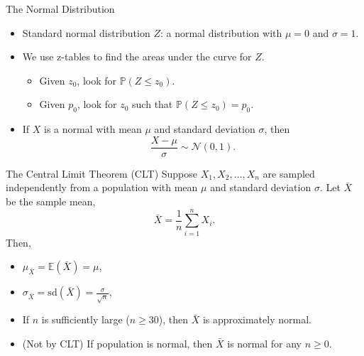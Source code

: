 \documentclass{beamer}
\newcommand{\pr}{\mathbb{P}}
\newcommand{\E}{\mathbb{E}}
\newcommand{\sd}{\text{sd}}
\begin{document}
\begin{frame}{ The Normal Distribution}
\begin{itemize}
    \item Standard normal distribution $Z$: a normal distribution with $\mu=0$ and $\sigma=1$.
    \item We use z-tables to find the areas under the curve for $Z$.
        \begin{itemize}
            \item Given $z_0$, look for $\pr(Z\leq z_0)$.
            \item Given $p_0$, look for $z_0$ such that $\pr(Z \leq z_0) = p_0$.
        \end{itemize}
    \item If $X$ is a normal with mean $\mu$ and standard deviation $\sigma$, then
        $$\frac{X-\mu}{\sigma} \sim \mathcal{N}(0,1).$$ 
\end{itemize}
\end{frame}

\begin{frame}{The Central Limit Theorem (CLT)}
    Suppose $X_1,X_2,\dots,X_n$ are sampled independently from a population with mean $\mu$ and 
    standard deviation $\sigma$. Let $\bar X$ be the sample mean, 
    $$\bar X = \frac{1}{n} \sum_{i=1}^n X_i.$$
    Then,
    \begin{itemize}
        \item  $\mu_{\bar X}= \E(\bar X) = \mu$,
        \item $\sigma_{\bar X} =\sd(\bar X) =  \frac{\sigma}{\sqrt{n}}$,
        \item  If $n$ is sufficiently large ($n\geq 30$), then $\bar X$ is approximately normal.
        \item (Not by CLT) If population is normal, then $\bar X$ is normal for any $n\geq 0$.
    \end{itemize}

\end{frame}
\end{document}
